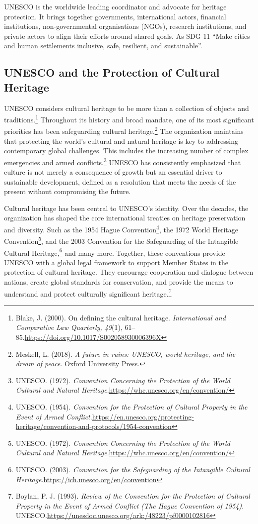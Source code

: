 UNESCO is the worldwide leading coordinator and advocate for heritage protection. It brings together governments, international actors,  financial institutions, non-governmental organisations (NGOs), research institutions, and private actors to align their efforts around shared goals. As SDG 11 “Make cities and human settlements inclusive, safe, resilient, and sustainable”.

\subsection{UNESCO and the Protection of Cultural Heritage}

UNESCO considers cultural heritage to be more than a collection of objects and traditions.\footnote{Blake, J. (2000). On defining the cultural heritage. \emph{International and Comparative Law Quarterly, 49}(1), 61–85.\url{https://doi.org/10.1017/S002058930006396X}} Throughout its history and broad mandate, one of its most significant priorities has been safeguarding cultural heritage.\footnote{Meskell, L. (2018). \emph{A future in ruins: UNESCO, world heritage, and the dream of peace}. Oxford University Press.} The organization maintains that protecting the world’s cultural and natural heritage is key to addressing contemporary global challenges. This includes the increasing number of complex emergencies and armed conflicts.\footnote{UNESCO. (1972). \emph{Convention Concerning the Protection of the World Cultural and Natural Heritage}.\url{https://whc.unesco.org/en/convention/}} UNESCO has consistently emphasized that culture is not merely a consequence of growth but an essential driver to sustainable development, defined as a resolution that meets the needs of the present without compromising the future.

Cultural heritage has been central to UNESCO’s identity. Over the decades, the organization has shaped the core international treaties on heritage preservation and diversity. Such as the 1954 Hague Convention\footnote{UNESCO. (1954). \emph{Convention for the Protection of Cultural Property in the Event of Armed Conflict}.\url{https://en.unesco.org/protecting-heritage/convention-and-protocols/1954-convention}}, the 1972 World Heritage Convention\footnote{UNESCO. (1972). \emph{Convention Concerning the Protection of the World Cultural and Natural Heritage}.\url{https://whc.unesco.org/en/convention/}}, and the 2003 Convention for the Safeguarding of the Intangible Cultural Heritage,\footnote{UNESCO. (2003). \emph{Convention for the Safeguarding of the Intangible Cultural Heritage}.\url{https://ich.unesco.org/en/convention}} and many more. Together, these conventions provide UNESCO with a global legal framework to support Member States in the protection of cultural heritage. They encourage cooperation and dialogue between nations, create global standards for conservation, and provide the means to understand and protect culturally significant heritage.\footnote{Boylan, P. J. (1993). \emph{Review of the Convention for the Protection of Cultural Property in the Event of Armed Conflict (The Hague Convention of 1954)}. UNESCO.\url{https://unesdoc.unesco.org/ark:/48223/pf0000102816}}

